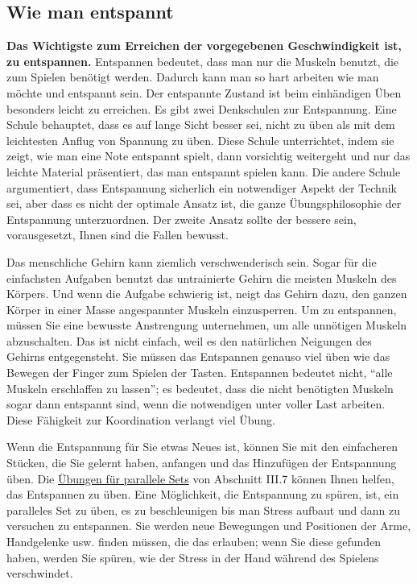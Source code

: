 \subsection{Wie man entspannt}
\label{c1ii14}

\textbf{Das Wichtigste zum Erreichen der vorgegebenen Geschwindigkeit ist, zu entspannen.}
Entspannen bedeutet, dass man nur die Muskeln benutzt, die zum Spielen benötigt werden.
Dadurch kann man so hart arbeiten wie man möchte und entspannt sein.
Der entspannte Zustand ist beim einhändigen Üben besonders leicht zu erreichen.
Es gibt zwei Denkschulen zur Entspannung.
Eine Schule behauptet, dass es auf lange Sicht besser sei, nicht zu üben als mit dem leichtesten Anflug von Spannung zu üben.
Diese Schule unterrichtet, indem sie zeigt, wie man eine Note entspannt spielt, dann vorsichtig weitergeht und nur das leichte Material präsentiert, das man entspannt spielen kann.
Die andere Schule argumentiert, dass Entspannung sicherlich ein notwendiger Aspekt der Technik sei, aber dass es nicht der optimale Ansatz ist, die ganze Übungsphilosophie der Entspannung unterzuordnen.
Der zweite Ansatz sollte der bessere sein, vorausgesetzt, Ihnen sind die Fallen bewusst.

Das menschliche Gehirn kann ziemlich verschwenderisch sein.
Sogar für die einfachsten Aufgaben benutzt das untrainierte Gehirn die meisten Muskeln des Körpers.
Und wenn die Aufgabe schwierig ist, neigt das Gehirn dazu, den ganzen Körper in einer Masse angespannter Muskeln einzusperren.
Um zu entspannen, müssen Sie eine bewusste Anstrengung unternehmen, um alle unnötigen Muskeln abzuschalten.
Das ist nicht einfach, weil es den natürlichen Neigungen des Gehirns entgegensteht.
Sie müssen das Entspannen genauso viel üben wie das Bewegen der Finger zum Spielen der Tasten.
Entspannen bedeutet nicht, \enquote{alle Muskeln erschlaffen zu lassen}; es bedeutet, dass die nicht benötigten Muskeln sogar dann entspannt sind, wenn die notwendigen unter voller Last arbeiten.
Diese Fähigkeit zur Koordination verlangt viel Übung.

Wenn die Entspannung für Sie etwas Neues ist, können Sie mit den einfacheren Stücken, die Sie gelernt haben, anfangen und das Hinzufügen der Entspannung üben.
Die \hyperref[c1iii7b]{Übungen für parallele Sets} von Abschnitt III.7 können Ihnen helfen, das Entspannen zu üben.
Eine Möglichkeit, die Entspannung zu spüren, ist, ein paralleles Set zu üben, es zu beschleunigen bis man Stress aufbaut und dann zu versuchen zu entspannen.
Sie werden neue Bewegungen und Positionen der Arme, Handgelenke usw. finden müssen, die das erlauben; wenn Sie diese gefunden haben, werden Sie spüren, wie der Stress in der Hand während des Spielens verschwindet.

